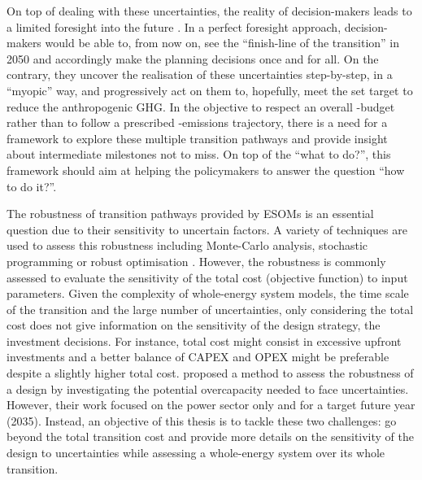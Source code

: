 On top of dealing with these uncertainties, the reality of decision-makers leads to a limited foresight into the future \cite{poncelet2016myopic}. In a perfect foresight approach, decision-makers would be able to, from now on, see the ``finish-line of the transition'' in 2050 and accordingly make the planning decisions once and for all. On the contrary, they uncover the realisation of these uncertainties step-by-step, in a ``myopic'' way, and progressively act on them to, hopefully, meet the set target to reduce the anthropogenic \gls{GHG}. In the objective to respect an overall -budget rather than to follow a prescribed -emissions trajectory, there is a need for a framework to explore these multiple transition pathways and provide insight about intermediate milestones not to miss. On top of the ``what to do?'', this framework should aim at helping the policymakers to answer the  question ``how to do it?''.

The robustness of transition pathways provided by ESOMs is an essential question due to their sensitivity to uncertain factors. A variety of techniques are used to assess this robustness including Monte-Carlo analysis, stochastic programming or robust optimisation \cite{yue2018review}. However, the robustness is commonly assessed to evaluate the sensitivity of the total cost (objective function) to input parameters.  Given the complexity of whole-energy system models, the time scale of the transition and the large number of uncertainties, only considering the total cost does not give information on the sensitivity of the design strategy, \ie the investment decisions. For instance, total cost might consist in excessive upfront investments and a better balance of \gls{CAPEX} and \gls{OPEX} might be preferable despite a slightly higher total cost. \citet{moret2020overcapacity} proposed a method to assess the robustness of a design by investigating the potential overcapacity needed to face uncertainties. However, their work focused on the power sector only and for a target future year (2035).  Instead, an objective of this thesis is to tackle these two challenges: go beyond the total transition cost and provide more details on the sensitivity of the design to uncertainties while assessing a whole-energy system over its whole transition.\\

